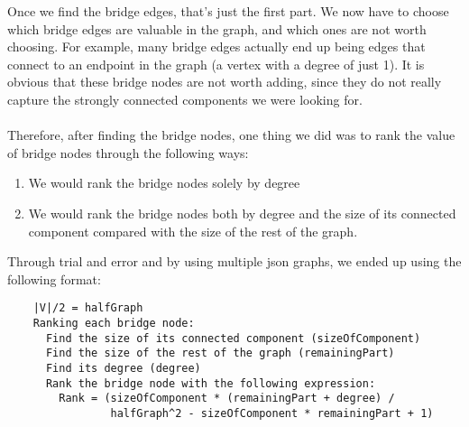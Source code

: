 \documentclass{article}
\begin{document}
  Once we find the bridge edges, that's just the first part. We now have to choose which bridge edges are valuable in the graph, and which ones are not worth choosing. For example, many bridge edges actually end up being edges that connect to an endpoint in the graph (a vertex with a degree of just 1).
  It is obvious that these bridge nodes are not worth adding, since they do
  not really capture the strongly connected components we were looking for.
  \\ \\
  Therefore, after finding the bridge nodes, one thing we did was to rank the value of bridge nodes through the following ways:
  \begin{enumerate}
    \item We would rank the bridge nodes solely by degree
    \item We would rank the bridge nodes both by degree and the size of its
          connected component compared with the size of the rest of the
          graph.
  \end{enumerate}

  Through trial and error and by using multiple json graphs, we ended up using
  the following format:
  \begin{verbatim}
    |V|/2 = halfGraph
    Ranking each bridge node:
      Find the size of its connected component (sizeOfComponent)
      Find the size of the rest of the graph (remainingPart)
      Find its degree (degree)
      Rank the bridge node with the following expression:
        Rank = (sizeOfComponent * (remainingPart + degree) / 
                halfGraph^2 - sizeOfComponent * remainingPart + 1)
  \end{verbatim}
\end{document}
